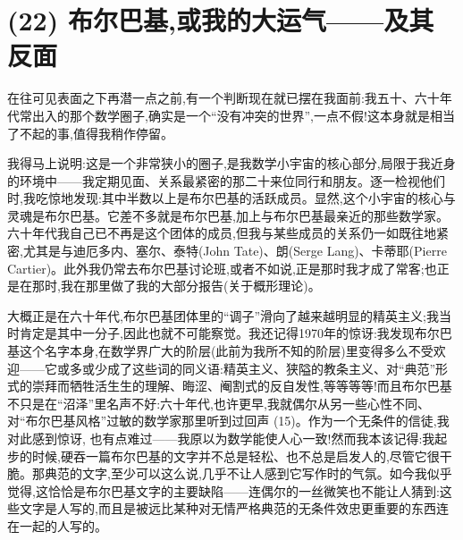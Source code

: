 \section{(22) 布尔巴基,或我的大运气——及其反面}

在往可见表面之下再潜一点之前,有一个判断现在就已摆在我面前:我五十、六十年代常出入的那个数学圈子,确实是一个“没有冲突的世界”,一点不假!这本身就是相当了不起的事,值得我稍作停留。

我得马上说明:这是一个非常狭小的圈子,是我数学小宇宙的核心部分,局限于我近身的环境中——我定期见面、关系最紧密的那二十来位同行和朋友。逐一检视他们时,我吃惊地发现:其中半数以上是布尔巴基的活跃成员。显然,这个小宇宙的核心与灵魂是布尔巴基。它差不多就是布尔巴基,加上与布尔巴基最亲近的那些数学家。六十年代我自己已不再是这个团体的成员,但我与某些成员的关系仍一如既往地紧密,尤其是与迪厄多内、塞尔、泰特(John Tate)、朗(Serge Lang)、卡蒂耶(Pierre Cartier)。此外我仍常去布尔巴基讨论班,或者不如说,正是那时我才成了常客;也正是在那时,我在那里做了我的大部分报告(关于概形理论)。

大概正是在六十年代,布尔巴基团体里的“调子”滑向了越来越明显的精英主义;我当时肯定是其中一分子,因此也就不可能察觉。我还记得1970年的惊讶:我发现布尔巴基这个名字本身,在数学界广大的阶层(此前为我所不知的阶层)里变得多么不受欢迎——它或多或少成了这些词的同义语:精英主义、狭隘的教条主义、对“典范”形式的崇拜而牺牲活生生的理解、晦涩、阉割式的反自发性,等等等等!而且布尔巴基不只是在“沼泽”里名声不好:六十年代,也许更早,我就偶尔从另一些心性不同、对“布尔巴基风格”过敏的数学家那里听到过回声 (15)。作为一个无条件的信徒,我对此感到惊讶, 
也有点难过——我原以为数学能使人心一致!然而我本该记得:我起步的时候,硬吞一篇布尔巴基的文字并不总是轻松、也不总是启发人的,尽管它很干脆。那典范的文字,至少可以这么说,几乎不让人感到它写作时的气氛。如今我似乎觉得,这恰恰是布尔巴基文字的主要缺陷——连偶尔的一丝微笑也不能让人猜到:这些文字是人写的,而且是被远比某种对无情严格典范的无条件效忠更重要的东西连在一起的人写的。

